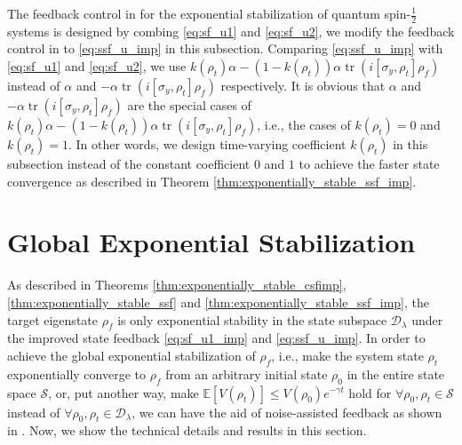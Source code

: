 \documentclass[]{elsarticle}
\begin{document}
The feedback control in \cite{WSJZJ2021b} for the exponential stabilization of quantum spin-$\frac{1}{2}$ systems is designed by combing \eqref{eq:sf_u1} and \eqref{eq:sf_u2}, we modify the feedback control in \cite{WSJZJ2021b} to \eqref{eq:ssf_u_imp} in this subsection. Comparing \eqref{eq:ssf_u_imp} with \eqref{eq:sf_u1} and \eqref{eq:sf_u2}, we use $k\left(\rho_{t}\right)\alpha-\left(1-k\left(\rho_{t}\right)\right)\alpha \operatorname{tr}\left(i\left[\sigma_{y}, \rho_{t}\right] \rho_f\right)$ instead of $\alpha$ and $-\alpha \operatorname{tr}\left(i\left[\sigma_{y}, \rho_{t}\right] \rho_f\right)$ respectively. It is obvious that $\alpha$ and $-\alpha \operatorname{tr}\left(i\left[\sigma_{y}, \rho_{t}\right] \rho_f\right)$ are the special cases of  $k\left(\rho_{t}\right)\alpha-\left(1-k\left(\rho_{t}\right)\right)\alpha \operatorname{tr}\left(i\left[\sigma_{y}, \rho_{t}\right] \rho_f\right)$, i.e., the cases of $k\left(\rho_{t}\right)=0$ and $k\left(\rho_{t}\right)=1$. In other words, we design time-varying coefficient $k\left(\rho_{t}\right)$ in this subsection instead of the constant coefficient $0$ and $1$ to achieve the faster state convergence as described in Theorem \ref{thm:exponentially_stable_ssf_imp}.


\section{Global Exponential Stabilization}\label{Sec:Global}
As described in Theorems \ref{thm:exponentially_stable_csfimp}, \ref{thm:exponentially_stable_ssf} and \ref{thm:exponentially_stable_ssf_imp}, the target eigenstate $\rho_{f}$ is only exponential stability in the state subspace $\mathcal{D}_\lambda$ under the improved state feedback \eqref{eq:sf_u1_imp} and \eqref{eq:ssf_u_imp}. In order to achieve the global exponential stabilization of $\rho_{f}$, i.e., make the system state $\rho_{t}$ exponentially converge to $\rho_{f}$ from an arbitrary initial state $\rho_{0}$ in the entire state space $\mathcal{S}$, or, put another way, make $\mathbb{E}\left[V(\rho_t)\right]\leq V(\rho_0) e^{-\gamma t}$ hold for $\forall \rho_0, \rho_{t}\in \mathcal{S}$ instead of $\forall \rho_0, \rho_{t}\in \mathcal{D}_\lambda$, we can have the aid of noise-assisted feedback as shown in \cite{WSJZJ2021c}. Now, we show the technical details and results in this section.
\end{document}
